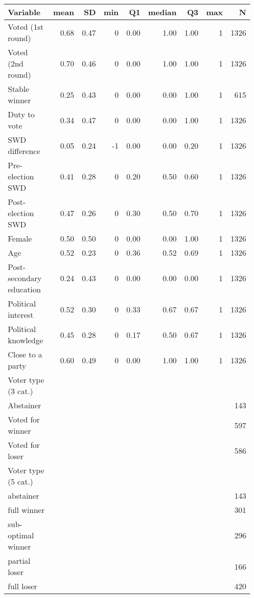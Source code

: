 
\begin{tabular}{l|r|r|r|r|r|r|r|r}
\hline
Variable & mean & SD & min & Q1 & median & Q3 & max & N\\
\hline
Voted (1st round) & 0.68 & 0.47 & 0 & 0.00 & 1.00 & 1.00 & 1 & 1326\\
\hline
Voted (2nd round) & 0.70 & 0.46 & 0 & 0.00 & 1.00 & 1.00 & 1 & 1326\\
\hline
Stable winner & 0.25 & 0.43 & 0 & 0.00 & 0.00 & 1.00 & 1 & 615\\
\hline
Duty to vote & 0.34 & 0.47 & 0 & 0.00 & 0.00 & 1.00 & 1 & 1326\\
\hline
SWD difference & 0.05 & 0.24 & -1 & 0.00 & 0.00 & 0.20 & 1 & 1326\\
\hline
Pre-election SWD & 0.41 & 0.28 & 0 & 0.20 & 0.50 & 0.60 & 1 & 1326\\
\hline
Post-election SWD & 0.47 & 0.26 & 0 & 0.30 & 0.50 & 0.70 & 1 & 1326\\
\hline
Female & 0.50 & 0.50 & 0 & 0.00 & 0.00 & 1.00 & 1 & 1326\\
\hline
Age & 0.52 & 0.23 & 0 & 0.36 & 0.52 & 0.69 & 1 & 1326\\
\hline
Post-secondary education & 0.24 & 0.43 & 0 & 0.00 & 0.00 & 0.00 & 1 & 1326\\
\hline
Political interest & 0.52 & 0.30 & 0 & 0.33 & 0.67 & 0.67 & 1 & 1326\\
\hline
Political knowledge & 0.45 & 0.28 & 0 & 0.17 & 0.50 & 0.67 & 1 & 1326\\
\hline
Close to a party & 0.60 & 0.49 & 0 & 0.00 & 1.00 & 1.00 & 1 & 1326\\
\hline
Voter type (3 cat.) &  &  &  &  &  &  &  & \\
\hline
Abstainer &  &  &  &  &  &  &  & 143\\
\hline
Voted for winner &  &  &  &  &  &  &  & 597\\
\hline
Voted for loser &  &  &  &  &  &  &  & 586\\
\hline
Voter type (5 cat.) &  &  &  &  &  &  &  & \\
\hline
abstainer &  &  &  &  &  &  &  & 143\\
\hline
full winner &  &  &  &  &  &  &  & 301\\
\hline
sub-optimal winner &  &  &  &  &  &  &  & 296\\
\hline
partial loser &  &  &  &  &  &  &  & 166\\
\hline
full loser &  &  &  &  &  &  &  & 420\\
\hline
\end{tabular}
